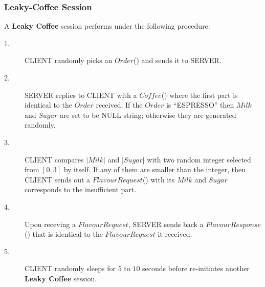 
\begin{definition}
\subsubsection{Leaky-Coffee Session}
A \textbf{Leaky Coffee} session performs under the following procedure:

\begin{description}
\item[1.] CLIENT randomly picks an $Order$() and sends it to SERVER.

\item[2.] SERVER replies to CLIENT with a $Coffee$() where the first part is identical to the $Order$ received. If the $Order$ is “ESPRESSO” then $Milk$ and $Sugar$ are set to be NULL string; otherwise they are generated randomly.

\item[3.] CLIENT compares $|Milk|$ and $|Sugar|$ with two random integer selected from $[0,3]$ by itself. If any of them are smaller than the integer, then CLIENT sends out a $FlavourRequest$() with its $Milk$ and $Sugar$ corresponds to the insufficient part.

\item[4.] Upon receving a $FlavourRequest$, SERVER sends back a $FlavourResponse$() that is identical to the $FlavourRequest$ it received.

\item[5.] CLIENT randomly sleeps for $5$ to $10$ seconds before re-initiates another \textbf{Leaky Coffee} session.
\end{description}
\end{definition}
%
%
